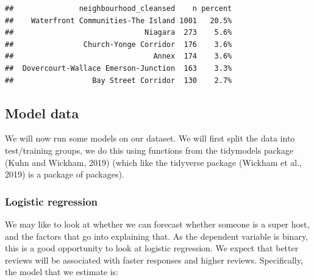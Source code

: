 \documentclass[
]{book}
\newenvironment{Shaded}{\begin{snugshade}}{\end{snugshade}}
\newcommand{\DataTypeTok}[1]{\textcolor[rgb]{0.13,0.29,0.53}{#1}}
\newcommand{\DecValTok}[1]{\textcolor[rgb]{0.00,0.00,0.81}{#1}}
\newcommand{\KeywordTok}[1]{\textcolor[rgb]{0.13,0.29,0.53}{\textbf{#1}}}
\newcommand{\NormalTok}[1]{#1}
\newcommand{\OperatorTok}[1]{\textcolor[rgb]{0.81,0.36,0.00}{\textbf{#1}}}
\newcommand{\StringTok}[1]{\textcolor[rgb]{0.31,0.60,0.02}{#1}}
\begin{document}
\begin{verbatim}
##               neighbourhood_cleansed    n percent
##    Waterfront Communities-The Island 1001   20.5%
##                              Niagara  273    5.6%
##                Church-Yonge Corridor  176    3.6%
##                                Annex  174    3.6%
##  Dovercourt-Wallace Emerson-Junction  163    3.3%
##                  Bay Street Corridor  130    2.7%
\end{verbatim}

\hypertarget{model-data}{%
\subsection{Model data}\label{model-data}}

We will now run some models on our dataset. We will first split the data into test/training groups, we do this using functions from the tidymodels package (Kuhn and Wickham, 2019) (which like the tidyverse package (Wickham et al., 2019) is a package of packages).

\begin{Shaded}
\end{Shaded}

\hypertarget{logistic-regression-1}{%
\subsubsection{Logistic regression}\label{logistic-regression-1}}

We may like to look at whether we can forecast whether someone is a super host, and the factors that go into explaining that. As the dependent variable is binary, this is a good opportunity to look at logistic regression. We expect that better reviews will be associated with faster responses and higher reviews. Specifically, the model that we estimate is:
\end{document}
